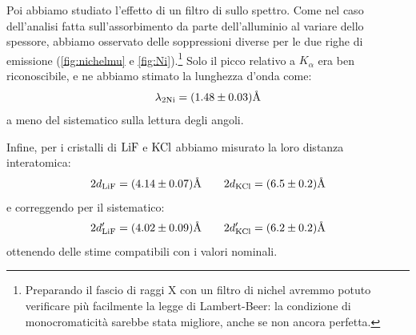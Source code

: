 Poi abbiamo studiato l'effetto di un filtro di  sullo spettro.
Come nel caso dell'analisi fatta sull'assorbimento da parte dell'alluminio al variare dello spessore, abbiamo osservato delle soppressioni diverse per le due righe di emissione (\cref{fig:nichelmu} e \cref{fig:Ni}).\footnote{Preparando il fascio di raggi X con un filtro di nichel avremmo potuto verificare più facilmente la legge di Lambert-Beer: la condizione di monocromaticità sarebbe stata migliore, anche se non ancora perfetta.}
Solo il picco relativo a $K_\alpha$ era ben riconoscibile, e ne abbiamo stimato la lunghezza d'onda come:
\begin{equation}
\lambda_{2\ce{Ni}} = (1.48 \pm 0.03) \unit{\angstrom}
\end{equation}
a meno del sistematico sulla lettura degli angoli.

Infine, per i cristalli di $\ce{LiF}$ e $\ce{KCl}$ abbiamo misurato la loro distanza interatomica:
\begin{equation}
2d_{\ce{LiF}} = (4.14 \pm 0.07) \unit{\angstrom}\qquad 2d_{\ce{KCl}} = (6.5 \pm 0.2) \unit{\angstrom}
\end{equation}
e correggendo per il sistematico:
\begin{equation}
  2d_{\ce{LiF}}' = (4.02 \pm 0.09) \unit{\angstrom} \qquad 2d_{\ce{KCl}}' = (6.2 \pm 0.2) \unit{\angstrom}
\end{equation}
ottenendo delle stime compatibili con i valori nominali.

